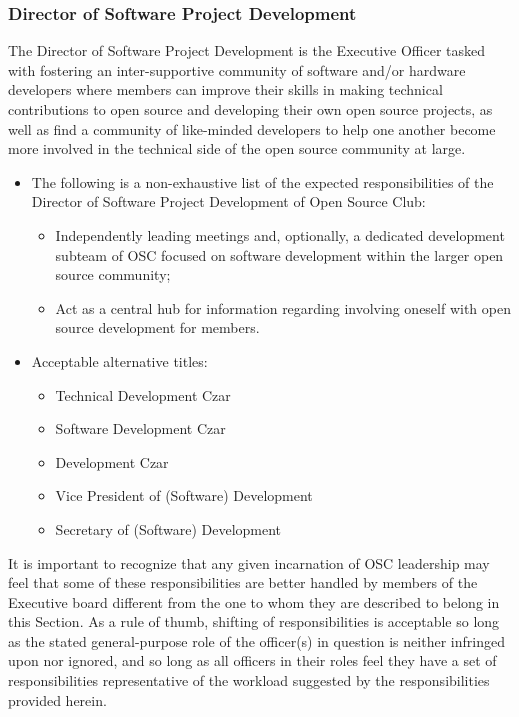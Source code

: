 \documentclass[12pt,letterpaper]{article}
\begin{document}
\subsubsection{Director of Software Project Development}
The Director of Software Project
Development is the Executive Officer tasked with fostering an inter-supportive community
of software and/or hardware developers where members can improve their skills in
making technical contributions to open source and developing their own open source
projects, as well as find a community of like-minded developers to help one another
become more involved in the technical side of the open source community at large. 
\begin{itemize}
  \item The following is a non-exhaustive list of the expected responsibilities of the
    Director of Software Project Development of Open Source Club:
    \begin{itemize}
      \item Independently leading meetings and, optionally, a dedicated development
        subteam of OSC focused on software development within the larger open source
        community;
      \item Act as a central hub for information regarding involving oneself with
        open source development for members.
    \end{itemize}
  \item Acceptable alternative titles:
    \begin{itemize}
      \item Technical Development Czar
      \item Software Development Czar
      \item Development Czar
      \item Vice President of (Software) Development
      \item Secretary of (Software) Development
    \end{itemize}
\end{itemize}

It is important to recognize that any given incarnation of OSC leadership may feel that
some of these responsibilities are better handled by members of the Executive board
different from the one to whom they are described to belong in this Section. As a rule of
thumb, shifting of responsibilities is acceptable so long as the stated general-purpose
role of the officer(s) in question is neither infringed upon nor ignored, and so long as
all officers in their roles feel they have a set of responsibilities representative of
the workload suggested by the responsibilities provided herein.
\end{document}
